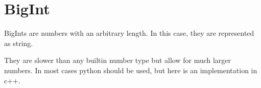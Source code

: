 \section*{BigInt}
    BigInts are numbers with an arbitrary length. In this case, they are represented as string.

    They are slower than any builtin number type but allow for much larger numbers. In most cases python should be used, but here is an implementation in c++.